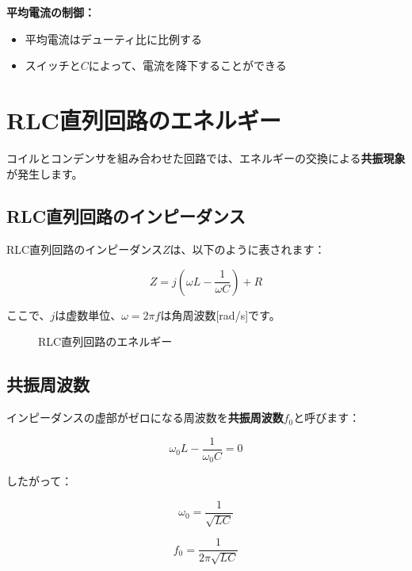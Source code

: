 \textbf{平均電流の制御：}

\begin{itemize}
\item 平均電流はデューティ比に比例する
\item スイッチと$C$によって、電流を降下することができる
\end{itemize}

\section{RLC直列回路のエネルギー}

コイルとコンデンサを組み合わせた回路では、エネルギーの交換による\textbf{共振現象}が発生します。

\subsection{RLC直列回路のインピーダンス}

RLC直列回路のインピーダンス$Z$は、以下のように表されます：

\begin{equation}
Z = j\left(\omega L - \frac{1}{\omega C}\right) + R
\end{equation}

ここで、$j$は虚数単位、$\omega = 2\pi f$は角周波数[rad/s]です。

\begin{figure}[H]
\centering
{}
\caption{RLC直列回路のエネルギー}
\label{fig:ch04_rlc_energy}
\end{figure}

\subsection{共振周波数}

インピーダンスの虚部がゼロになる周波数を\textbf{共振周波数}$f_0$と呼びます：

\begin{equation}
\omega_0 L - \frac{1}{\omega_0 C} = 0
\end{equation}

したがって：

\begin{equation}
\omega_0 = \frac{1}{\sqrt{LC}}
\end{equation}

\begin{equation}
\boxed{f_0 = \frac{1}{2\pi\sqrt{LC}}}
\end{equation}

